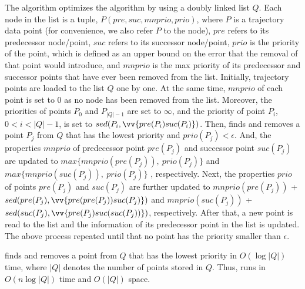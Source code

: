 The \squishe algorithm optimizes the \tpa algorithm by using a doubly linked list $Q$. Each node in the list is a tuple, \ie $P(pre, suc, mnprio, prio)$, where $P$ is a trajectory data point (for convenience, we also refer $P$ to the node), $pre$ refers to its predecessor node/point, $suc$ refers to its successor node/point, $prio$ is the priority of the point, which is defined as an upper bound on the \sed error that the removal of that point would introduce, and $mnprio$ is the max priority of its predecessor and successor points that have ever been removed from the list.
%
Initially, trajectory points are loaded to the list $Q$ one by one.
At the same time, $mnprio$ of each point is set to $0$ as no node has been removed from the list.
Moreover, the priorities of points $P_0$ and $P_{|Q|-1}$ are set to $\infty$, and the priority of point $P_i$, $0<i<|Q|-1$, is set to $sed(P_i, \vv{pre(P_{i})suc(P_{i})})$.
%
Then, \squishe finds and removes a point $P_j$ from $Q$ that has the lowest priority and $prio(P_j)<\epsilon$.
And, the properties $mnprio$ of predecessor point $pre(P_j)$ and successor point $suc(P_j)$ are updated to $max\{mnprio(pre(P_j)), ~prio(P_j)\}$ and $max\{mnprio(suc(P_j)), ~prio(P_j)\}$ , respectively.
Next, the properties $prio$ of points $pre(P_j)$ and $suc(P_j)$ are further updated to $mnprio(pre(P_j))$ + $sed(pre(P_j), \vv{pre(pre(P_{j}))suc(P_{j})})$ and $mnprio(suc(P_j))$ + $sed(suc(P_j),\vv{pre(P_{j})suc(suc(P_{j}))})$, respectively.
%
After that, a new point is read to the list and the information of its predecessor point in the list is updated.
%
The above process repeated until that no point has the priority smaller than $\epsilon$. %

\squishe finds and removes a point from $Q$ that has the lowest priority in $O(\log |Q|)$ time, where $|Q|$ denotes the number of points stored in $Q$.
Thus, \squishe runs in $O(n\log |Q|)$ time and $O(|Q|)$ space. 

